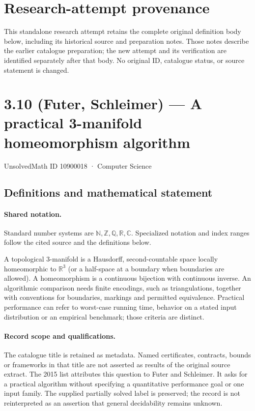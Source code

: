 \documentclass[11pt]{article}
\begin{document}
\section*{Research-attempt provenance}
This standalone research attempt retains the complete original definition body below,
including its historical source and preparation notes. Those notes describe the
earlier catalogue preparation; the new attempt and its verification are identified
separately after that body. No original ID, catalogue status, or source statement is changed.

\section{3.10 (Futer, Schleimer) — A practical 3-manifold homeomorphism algorithm}\label{10900018}
{\small UnsolvedMath ID 10900018 · Computer Science}
\subsection{Definitions and mathematical statement}

\paragraph{Shared notation.}Standard number systems are $\mathbb N,\mathbb Z,\mathbb Q,\mathbb R,\mathbb C$. Specialized notation and index ranges follow the cited source and the definitions below.


A topological $3$-manifold is a Hausdorff, second-countable space locally homeomorphic to $\mathbb R^3$ (or a half-space at a boundary when boundaries are allowed). A homeomorphism is a continuous bijection with continuous inverse. An algorithmic comparison needs finite encodings, such as triangulations, together with conventions for boundaries, markings and permitted equivalence. Practical performance can refer to worst-case running time, behavior on a stated input distribution or an empirical benchmark; those criteria are distinct.
\paragraph{Record scope and qualifications.}
The catalogue title is retained as metadata. Named certificates, contracts, bounds or frameworks in that title are not asserted as results of the original source extract.
The 2015 list attributes this question to Futer and Schleimer. It asks for a practical algorithm without specifying a quantitative performance goal or one input family. The supplied partially solved label is preserved; the record is not reinterpreted as an assertion that general decidability remains unknown.
\end{document}

